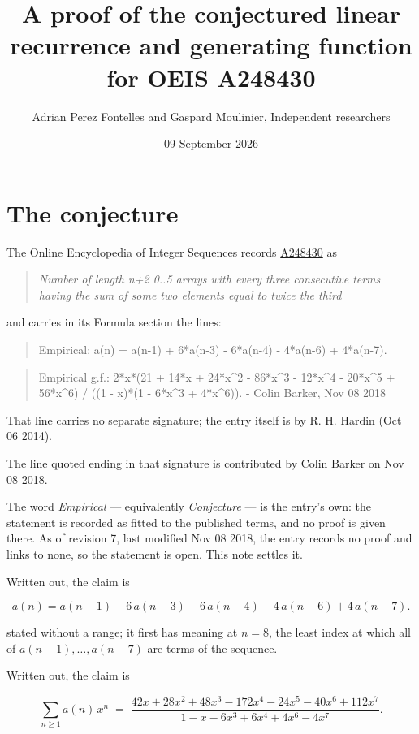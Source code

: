\documentclass[11pt]{article}
\title{A proof of the conjectured linear recurrence and generating function for OEIS A248430}
\author{Adrian Perez Fontelles and Gaspard Moulinier, Independent researchers}
\date{09 September 2026}
\theoremstyle{definition}
\begin{document}
\maketitle
\section{The conjecture}

The Online Encyclopedia of Integer Sequences records \href{https://oeis.org/A248430}{A248430} as

\begin{quote}\itshape Number of length n+2 0..5 arrays with every three consecutive terms having the sum of some two elements equal to twice the third\end{quote}

and carries in its Formula section the lines:

\begin{quote}\ttfamily Empirical: a(n) = a(n-1) + 6*a(n-3) - 6*a(n-4) - 4*a(n-6) + 4*a(n-7).\end{quote}

\begin{quote}\ttfamily Empirical g.f.: 2*x*(21 + 14*x + 24*x\textasciicircum{}2 - 86*x\textasciicircum{}3 - 12*x\textasciicircum{}4 - 20*x\textasciicircum{}5 + 56*x\textasciicircum{}6) / ((1 - x)*(1 - 6*x\textasciicircum{}3 + 4*x\textasciicircum{}6)). - Colin Barker, Nov 08 2018\end{quote}

That line carries no separate signature; the entry itself is by R. H. Hardin (Oct 06 2014).

The line quoted ending in that signature is contributed by Colin Barker on Nov 08 2018.

The word {\itshape Empirical} --- equivalently {\itshape Conjecture} --- is the entry's own: the statement is recorded as fitted to the published terms, and no proof is given there. As of revision 7, last modified Nov 08 2018, the entry records no proof and links to none, so the statement is open. This note settles it.

Written out, the claim is

\[a(n) = a(n-1) + 6\,a(n-3) - 6\,a(n-4) - 4\,a(n-6) + 4\,a(n-7).\]

stated without a range; it first has meaning at $n = 8$, the least index at which all of $a(n-1),\dots,a(n-7)$ are terms of the sequence.

Written out, the claim is

\[\sum_{n \ge 1} a(n)\,x^n \;=\; \frac{42x + 28x^{2} + 48x^{3} - 172x^{4} - 24x^{5} - 40x^{6} + 112x^{7}}{1 - x - 6x^{3} + 6x^{4} + 4x^{6} - 4x^{7}}.\]
\end{document}
